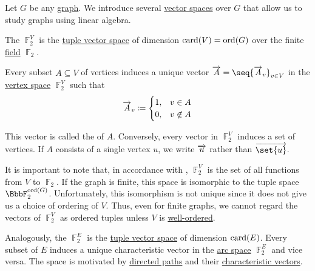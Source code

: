 \begin{definition}\label{def:multigraph_vector_spaces}
  Let \( G \) be any \hyperref[def:graph]{graph}. We introduce several \hyperref[def:vector_space]{vector spaces} over \( G \) that allow us to study graphs using linear algebra.

  \begin{thmenum}
     The  \( \BbbF_2^V \) is the \hyperref[def:left_module_of_tuples]{tuple vector space} of dimension \( \operatorname{card}(V) = \operatorname{ord}(G) \) over the finite \hyperref[def:field]{field} \hyperref[thm:f2_is_boolean_algebra]{\( \BbbF_2 \)}.

    Every subset \( A \subseteq V \) of vertices induces a unique vector \( \vect{A} = \seq{ \vect{A}_v }_{v \in V} \) in the \hyperref[def:multigraph_vector_spaces/vertex]{vertex space} \( \BbbF_2^V \) such that
    \begin{equation*}
      \overrightarrow{A}_v \coloneqq \begin{cases}
        1, &v \in A \\
        0, &v \not\in A
      \end{cases}
    \end{equation*}

    This vector is called the  of \( A \). Conversely, every vector in \( \BbbF_2^V \) induces a set of vertices. If \( A \) consists of a single vertex \( u \), we write \( \overrightarrow{u} \) rather than \( \vect{\set{u}} \).

    It is important to note that, in accordance with , \( \BbbF_2^V \) is the set of all functions from \( V \) to \( \BbbF_2 \). If the graph is finite, this space is isomorphic to the tuple space \( \BbbF_2^{\ord(G)} \). Unfortunately, this isomorphism is not unique since it does not give us a choice of ordering of \( V \). Thus, even for finite graphs, we cannot regard the vectors of \( \BbbF_2^V \) as ordered tuples unless \( V \) is \hyperref[def:well_ordered_set]{well-ordered}.

     Analogously, the  \( \BbbF_2^E \) is the \hyperref[def:left_module_of_tuples]{tuple vector space} of dimension \( \operatorname{card}(E) \). Every subset of \( E \) induces a unique characteristic vector in the \hyperref[def:multigraph_vector_spaces/arc]{arc space} \( \BbbF_2^E \) and vice versa. The space is motivated by \hyperref[def:quiver_directed_path]{directed paths} and their \hyperref[def:quiver_directed_path/characteristic_vector]{characteristic vectors}.


\end{thmenum}
\end{definition}
